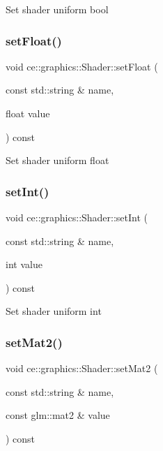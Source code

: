 Set shader uniform bool \mbox{\label{classce_1_1graphics_1_1_shader_a31d56ffb50a079444baf27c863023efc}} 
\subsubsection{\texorpdfstring{set\+Float()}{setFloat()}}
{\footnotesize\ttfamily void ce\+::graphics\+::\+Shader\+::set\+Float (\begin{DoxyParamCaption}\item[{const std\+::string \&}]{name,  }\item[{float}]{value }\end{DoxyParamCaption}) const}

Set shader uniform float \mbox{\label{classce_1_1graphics_1_1_shader_ab0599b30f759cd140b3c1727673c4665}} 
\subsubsection{\texorpdfstring{set\+Int()}{setInt()}}
{\footnotesize\ttfamily void ce\+::graphics\+::\+Shader\+::set\+Int (\begin{DoxyParamCaption}\item[{const std\+::string \&}]{name,  }\item[{int}]{value }\end{DoxyParamCaption}) const}

Set shader uniform int \mbox{\label{classce_1_1graphics_1_1_shader_a6355f9a1480838ce2f1ef8030ef1c259}} 
\subsubsection{\texorpdfstring{set\+Mat2()}{setMat2()}}
{\footnotesize\ttfamily void ce\+::graphics\+::\+Shader\+::set\+Mat2 (\begin{DoxyParamCaption}\item[{const std\+::string \&}]{name,  }\item[{const glm\+::mat2 \&}]{value }\end{DoxyParamCaption}) const}

